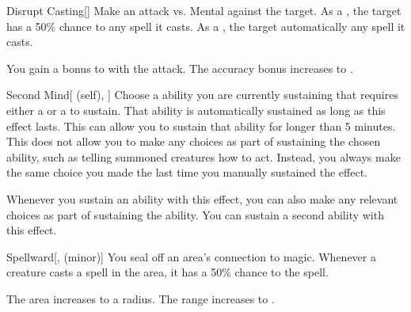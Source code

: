 \lowercase{\hypertarget{spell:Disrupt Casting}{}}\label{spell:Disrupt Casting}
\begin{freeability}[Rank 4]{\hypertarget{spell:Disrupt Casting}{Disrupt Casting}}[]
Make an attack vs. Mental against the target.
\hit As a , the target has a 50\% chance to  any spell it casts.
\crit As a , the target automatically  any spell it casts.

\rankline
{} You gain a  bonus to  with the attack.
 The accuracy bonus increases to .
\end{freeability}
\vspace{0.25em}



\lowercase{\hypertarget{spell:Second Mind}{}}\label{spell:Second Mind}
\begin{attuneability}[Rank 4]{\hypertarget{spell:Second Mind}{Second Mind}}[ (self), ]
Choose a  ability you are currently sustaining that requires either a  or a  to sustain.
That ability is automatically sustained as long as this effect lasts.
This can allow you to sustain that ability for longer than 5 minutes.
This does not allow you to make any choices as part of sustaining the chosen ability, such as telling summoned creatures how to act.
Instead, you always make the same choice you made the last time you manually sustained the effect.

\rankline
{} Whenever you sustain an ability with this effect, you can also make any relevant choices as part of sustaining the ability.
 You can sustain a second ability with this effect.
\end{attuneability}
\vspace{0.25em}



\lowercase{\hypertarget{spell:Spellward}{}}\label{spell:Spellward}
\begin{freeability}[Rank 4]{\hypertarget{spell:Spellward}{Spellward}}[,  (minor)]
You seal off an area's connection to magic.
Whenever a creature casts a spell in the area, it has a 50\% chance to  the spell.

\rankline
{} The area increases to a \areamed radius.
 The range increases to \rnglong.
\end{freeability}
\vspace{0.25em}



